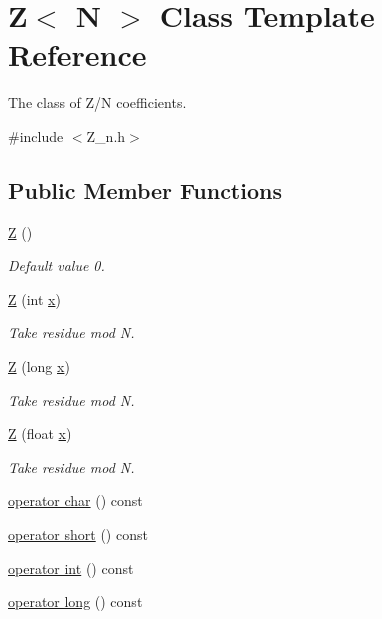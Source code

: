\hypertarget{classZ}{}\section{Z$<$ N $>$ Class Template Reference}
\label{classZ}


The class of Z/N coefficients.  




{\ttfamily \#include $<$Z\+\_\+n.\+h$>$}

\subsection*{Public Member Functions}
\begin{DoxyCompactItemize}
\item 
\hyperlink{classZ_a21a5a03bc44e0a76607d1b89dc9e31cb}{Z} ()
\begin{DoxyCompactList}\small\item\em Default value 0. \end{DoxyCompactList}\item 
\hyperlink{classZ_aa6546d6135c97a5b8df9028068dfe0c1}{Z} (int \hyperlink{classZ_a81f004f23dff9772403dd7a4452ad3c6}{x})
\begin{DoxyCompactList}\small\item\em Take residue mod N. \end{DoxyCompactList}\item 
\hyperlink{classZ_a55fa70d38bc723f35e27139239bf385a}{Z} (long \hyperlink{classZ_a81f004f23dff9772403dd7a4452ad3c6}{x})
\begin{DoxyCompactList}\small\item\em Take residue mod N. \end{DoxyCompactList}\item 
\hyperlink{classZ_a32b7b05c9f2e161d1b9fc60dd1e7a27b}{Z} (float \hyperlink{classZ_a81f004f23dff9772403dd7a4452ad3c6}{x})
\begin{DoxyCompactList}\small\item\em Take residue mod N. \end{DoxyCompactList}\item 
\hyperlink{classZ_ae97fcd6db1faa3170e7764670b3ea1a9}{operator char} () const
\item 
\hyperlink{classZ_ab40054217aadcaf96bc394e8593c0d69}{operator short} () const
\item 
\hyperlink{classZ_af687c6f9e1dc94110596c3552351d257}{operator int} () const
\item 
\hyperlink{classZ_ab21d99c84819bcbc6de88489a5375be4}{operator long} () const

\end{DoxyCompactItemize}
